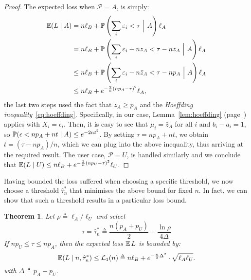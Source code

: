 \documentclass[a4paper]{article}
\newenvironment{IEEEproof}{\begin{proof}}{\end{proof}}
\newcommand \defn {\mathrel{\triangleq}}
\newcommand \ELb {\mathcal{L}}
\renewcommand\Pr{\mathop{\mbox{\ensuremath{\mathbb{P}}}}\nolimits}
\newcommand\E{\mathop{\mbox{\ensuremath{\mathbb{E}}}}\nolimits}
\newcommand \thr {\tau}
\newcommand \hthr {\hat{\thr}_n^*}
\newcommand \err {\varepsilon}
\newcommand \loss {L}
\newcommand \pa {p_A}
\newcommand \pu {p_U}
\newcommand \LA {\ell_A}
\newcommand \LU {\ell_U}
\newcommand \LB {\ell_B}
\newcommand \auth {\mathcal{P}}
\theoremstyle{plain} \newtheorem{remark}{Remark}
\theoremstyle{plain} \newtheorem{definition}{Definition}
\theoremstyle{plain} \newtheorem{example}{Example}
\theoremstyle{plain} \newtheorem{assumption}{Assumption}
\theoremstyle{plain} \newtheorem{conjecture}{Conjecture}
\theoremstyle{plain} \newtheorem{theorem}{Theorem}
\theoremstyle{plain} \newtheorem{proposition}{Proposition}
\theoremstyle{plain} \newtheorem{lemma}{Lemma}
\theoremstyle{plain} \newtheorem{corollary}{Corollary}
\begin{document}
\begin{IEEEproof}
  The expected loss when $\auth = A$, is simply:
  \begin{align*}
    \E(\loss \mid A)
    &= n\LB + \Pr\left(\sum_i \err_i < \thr ~\Big|~ A\right) \LA
    \\
    & 
    = n\LB + \Pr\left(\sum_i \err_i - n \bar{z}_A < \thr - n \bar{z}_A ~\Big|~ A\right) \LA
    \\
    &\leq n\LB + \Pr\left(\sum_i \err_i - n \bar{z}_A < \thr - n\pa ~\Big|~ A\right) \LA
    \\
    &
\leq n\LB + e^{-\frac{2}{n}(n\pa - \thr)^2} \LA,
  \end{align*}
  the last two steps used the fact that $\bar{z}_A \geq \pa$ and the
  \textit{Hoeffding inequality}~\eqref{eq:hoeffding}. Specifically, in
  our case, Lemma~\ref{lem:hoeffding} (page~\pageref{lem:hoeffding})
  applies with $X_i = \epsilon_i$. Then, it is easy to see that $\mu_i
  = \bar{z}_A$ for all $i$ and $b_i - a_i = 1$, so $\Pr( \epsilon < n
  \pa + n t \mid A) \leq e^{-2nt^2}$.  By setting $\thr = n\pa + nt$,
  we obtain $t = (\thr - n\pa)/n$, which we can plug into the above
  inequality, thus arriving at the required result.  The user case,
  $\auth = U$, is handled similarly and we conclude that $\E(\loss
  \mid U) \leq n\LB + e^{-\frac{2}{n}(n\pu - \thr)^2} \LU$.
\end{IEEEproof}
Having bounded the loss suffered when choosing a specific threshold,
we now choose a threshold $\hthr$ that minimises the above bound for
fixed $n$. In fact, we can show that such a threshold results in a
particular loss bound.
\begin{theorem}
  Let $\rho \defn \LA / \LU$ and select
  \begin{equation}
    \thr = \hthr \defn
\frac {n(\pa + \pu)} {2} - \frac {\ln{\rho}} {4\Delta}
    \label{eq:opt-threshold}
  \end{equation}
  If $n\pu \leq \tau \leq n \pa$, then the expected loss $\E \loss$ is
  bounded by:
  \begin{equation}
    \E (\loss \mid n, \hthr) \leq \ELb_1(n) \defn n\LB + e^{-\frac{n}{2}\Delta^2} \cdot \sqrt{\LA \LU}.
    \label{eq:threshold-loss-bound}
  \end{equation}
  with $\Delta \defn \pa - \pu$.
  \label{thm:threshold}
\end{theorem}
\end{document}
